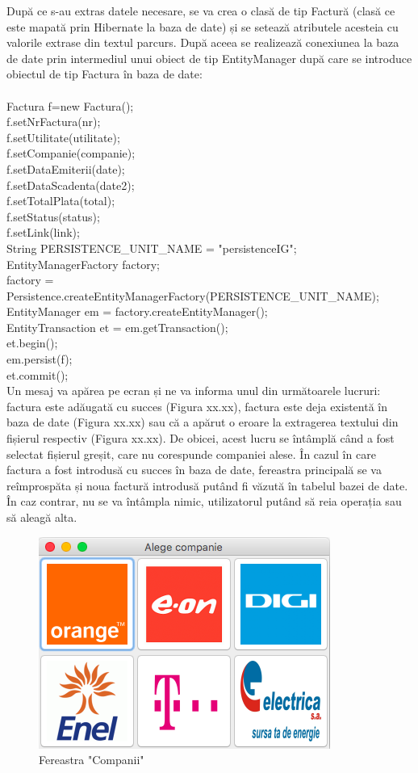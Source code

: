 \documentclass[12pt]{book}
\begin{document}
 După ce s-au extras datele necesare, se va crea o clasă de tip Factură (clasă ce este mapată prin Hibernate la baza de date) și se setează atributele acesteia cu valorile extrase din textul parcurs. După aceea se realizează conexiunea la baza de date prin intermediul unui obiect de tip EntityManager după care se introduce obiectul de tip Factura în baza de date:  \\\\
 Factura f=new Factura();\\
 f.setNrFactura(nr);\\
 f.setUtilitate(utilitate);\\
 f.setCompanie(companie);\\
 f.setDataEmiterii(date);\\
 f.setDataScadenta(date2);\\
 f.setTotalPlata(total);\\
 f.setStatus(status);\\
 f.setLink(link);\\
 String PERSISTENCE\_UNIT\_NAME = "persistenceIG";\\
 EntityManagerFactory factory;\\
 factory = Persistence.createEntityManagerFactory(PERSISTENCE\_UNIT\_NAME);\\
 EntityManager em = factory.createEntityManager();\\
 EntityTransaction et = em.getTransaction();\\
 et.begin();\\
 em.persist(f);\\
 et.commit();\\
 
 Un mesaj va apărea pe ecran și ne va informa unul din următoarele lucruri: factura este adăugată cu succes (Figura xx.xx), factura este deja existentă în baza de date (Figura xx.xx) sau că a apărut o eroare la extragerea textului din fișierul respectiv (Figura xx.xx). De obicei, acest lucru se întâmplă când a fost selectat fișierul greșit, care nu corespunde companiei alese. În cazul în care factura a fost introdusă cu succes în baza de date, fereastra principală se va reîmprospăta și noua factură introdusă putând fi văzută în tabelul bazei de date. În caz contrar, nu se va întâmpla nimic, utilizatorul putând să reia operația sau să aleagă alta.
\begin{figure}[!ht]
	\centering
	\includegraphics{Companii}
	\caption{Fereastra "Companii"}
\end{figure}
\end{document}
